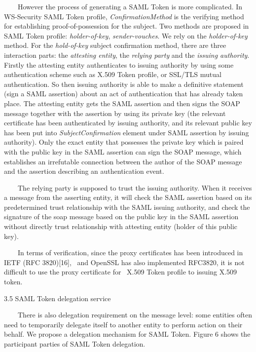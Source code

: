 \documentclass{article}
\begin{document}
\ \ \ \ However the process of generating a SAML Token is more
complicated. In WS-Security SAML Token profile,
\textit{ConfirmationMethod} is the verifying method for establishing
proof-of-possession for the subject. Two methods are proposed in SAML
Token profile: \textit{holder-of-key}, \textit{sender-vouches}. We rely
on the \textit{holder-of-key }method. For the \textit{hold-of-key}
subject confirmation method, there are three interaction parts: the
\textit{attesting entity}, the \textit{relying party} and the
\textit{issuing authority}. Firstly the attesting entity authenticates
to issuing authority by using some authentication scheme such as X.509
Token profile, or SSL/TLS mutual authentication. So then issuing
authority is able to make a definitive statement (sign a SAML
assertion) about an act of authentication that has already taken place.
The attesting entity gets the SAML assertion and then signs the SOAP
message together with the assertion by using its private key (the
relevant certificate has been authenticated by issuing authority, and
its relevant public key has been put into \textit{SubjectConfirmation}
element under SAML assertion by issuing authority). Only the exact
entity that possesses the private key which is paired with the public
key in the SAML assertion can sign the SOAP message, which establishes
an irrefutable connection between the author of the SOAP message and
the assertion describing an authentication event.

\ \ \ \ The relying party is supposed to trust the issuing authority.
When it receives a message from the asserting entity, it will check the
SAML assertion based on its predetermined trust relationship with the
SAML issuing authority, and check the signature of the soap message
based on the public key in the SAML assertion without directly trust
relationship with attesting entity (holder of this public key). 

\ \ \ \ In terms of verification, since the proxy certificates has been
introduced in IETF (RFC 3820)[16], \ and OpenSSL has also implemented
RFC3820, it is not difficult to use the proxy certificate for \ X.509
Token profile to issuing X.509 token.


\bigskip

3.5 SAML Token delegation service

\ \ \ \ There is also delegation requirement on the message level: some
entities often need to temporarily delegate itself to another entity to
perform action on their behalf. We propose a delegation mechanism for
SAML Token. Figure 6 shows the participant parties of SAML Token
delegation.
\end{document}
